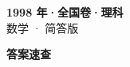\documentclass[zihao=-4, a4paper]{ctexart}
\begin{document}
\begin{center}
  {\Large\bfseries 1998 年·全国卷·理科}\\[4pt]
  {\large 数学 · 简答版}
\end{center}
\medskip
{}

\clearpage
{}
\begin{center}{\Large\bfseries 答案速查}\end{center}
\medskip

\end{document}
